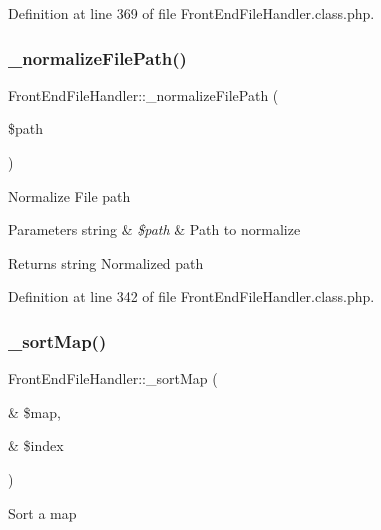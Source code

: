 Definition at line 369 of file Front\+End\+File\+Handler.\+class.\+php.

\hypertarget{classFrontEndFileHandler_a4818293d9395dd1b4d62b8cabeb04603}{}\label{classFrontEndFileHandler_a4818293d9395dd1b4d62b8cabeb04603} 
\subsubsection{\texorpdfstring{\+\_\+normalize\+File\+Path()}{\_normalizeFilePath()}}
{\footnotesize\ttfamily Front\+End\+File\+Handler\+::\+\_\+normalize\+File\+Path (\begin{DoxyParamCaption}\item[{}]{\$path }\end{DoxyParamCaption})}

Normalize File path


\begin{DoxyParams}[1]{Parameters}
string & {\em \$path} & Path to normalize \\
\hline
\end{DoxyParams}
\begin{DoxyReturn}{Returns}
string Normalized path 
\end{DoxyReturn}


Definition at line 342 of file Front\+End\+File\+Handler.\+class.\+php.

\hypertarget{classFrontEndFileHandler_a3677abdd2a1a3a17fd1de9f58ffe27a5}{}\label{classFrontEndFileHandler_a3677abdd2a1a3a17fd1de9f58ffe27a5} 
\subsubsection{\texorpdfstring{\+\_\+sort\+Map()}{\_sortMap()}}
{\footnotesize\ttfamily Front\+End\+File\+Handler\+::\+\_\+sort\+Map (\begin{DoxyParamCaption}\item[{\&}]{\$map,  }\item[{\&}]{\$index }\end{DoxyParamCaption})}

Sort a map


